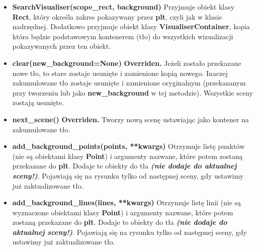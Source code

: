 \documentclass[a4paper, 12pt]{article}
\begin{document}
      \begin{itemize}
          \item \textbf{SearchVisualiser(scope\_rect, background)} \vspace{6pt}\newline
          \quad \quad Przyjmuje obiekt klasy \textbf{Rect}, który określa zakres pokazywany przez \textbf{plt}, czyli jak w klasie nadrzędnej. Dodatkowo przyjmuje obiekt klasy \textbf{VisualiserContainer}, kopia która będzie podstawowym kontenerem (tło) do wszystkich wizualizacji pokazywanych przez ten obiekt.
          \vspace{6pt}
          
          \item \textbf{clear(new\_background=None)} \vspace{6pt}\newline
          \quad \textbf{Overriden.} Jeżeli zostało przekazane nowe tło, to stare zostaje usunięte i zamienione kopią nowego. Inaczej zakumulowane tło zostaje usunięte i zamienione oryginalnym (przekazanym przy tworzeniu lub jako \textbf{new\_background} w tej metodzie). Wszystkie sceny zostają usunięte.
          \vspace{6pt}
          
          \item \textbf{next\_scene()} \vspace{6pt}\newline
          \quad \textbf{Overriden.} Tworzy nową scenę ustawiając jako kontener na zakumulowane tło.
          \vspace{6pt}
          
          \item \textbf{add\_background\_points(points, **kwargs)} \vspace{6pt}\newline
          \quad Otrzymuje listę punktów (nie są obiektami klasy \textbf{Point}) i argumenty nazwane, które potem zostaną przekazane do \textbf{plt}. Dodaje te obiekty do tła \textbf{\textit{(nie dodaje do aktualnej sceny!)}}. Pojawiają się na rysunku tylko od następnej sceny, gdy ustawimy już zaktualizowane tło.
          \vspace{6pt}
          
          \item \textbf{add\_background\_lines(lines, **kwargs)} \vspace{6pt}\newline
          \quad Otrzymuje listę linii (nie są wyznaczone obiektami klasy \textbf{Point}) i argumenty nazwane, które potem zostaną przekazane do \textbf{plt}. Dodaje te obiekty do tła \textbf{\textit{(nie dodaje do aktualnej sceny!)}}. Pojawiają się na rysunku tylko od następnej sceny, gdy ustawimy już zaktualizowane tło.
          \vspace{6pt}
          

\end{itemize}
\end{document}
